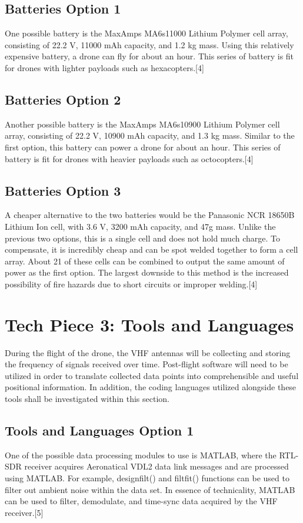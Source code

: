 \documentclass[onecolumn, draftclsnofoot,10pt, compsoc]{IEEEtran}
\begin{document}
\subsection{Batteries Option 1}
One possible battery is the MaxAmps MA6s11000 Lithium Polymer cell array, consisting of 22.2 V, 11000 mAh capacity, and 1.2 kg mass. Using this relatively expensive battery, a drone can fly for about an hour. This series of battery is fit for drones with lighter payloads such as hexacopters.[4]
\subsection{Batteries Option 2}
Another possible battery is the MaxAmps MA6s10900 Lithium Polymer cell array, consisting of 22.2 V, 10900 mAh capacity, and 1.3 kg mass. Similar to the first option, this battery can power a drone for about an hour. This series of battery is fit for drones with heavier payloads such as octocopters.[4]
\subsection{Batteries Option 3}
A cheaper alternative to the two batteries would be the Panasonic NCR 18650B Lithium Ion cell, with 3.6 V, 3200 mAh capacity, and 47g mass. Unlike the previous two options, this is a single cell and does not hold much charge. To compensate, it is incredibly cheap and can be spot welded together to form a cell array. About 21 of these cells can be combined to output the same amount of power as the first option. The largest downside to this method is the increased possibility of fire hazards due to short circuits or improper welding.[4]
\section{Tech Piece 3: Tools and Languages}
During the flight of the drone, the VHF antennas will be collecting and storing the frequency of signals received over time. Post-flight software will need to be utilized in order to translate collected data points into comprehensible and useful positional information. In addition, the coding languages utilized alongside these tools shall be investigated within this section.
\subsection{Tools and Languages Option 1}
One of the possible data processing modules to use is MATLAB, where the RTL-SDR receiver acquires Aeronatical VDL2 data link messages and are processed using MATLAB. For example, designfilt() and filtfit() functions can be used to filter out ambient noise within the data set. In essence of technicality, MATLAB can be used to filter, demodulate, and time-sync data acquired by the VHF receiver.[5]
\end{document}
